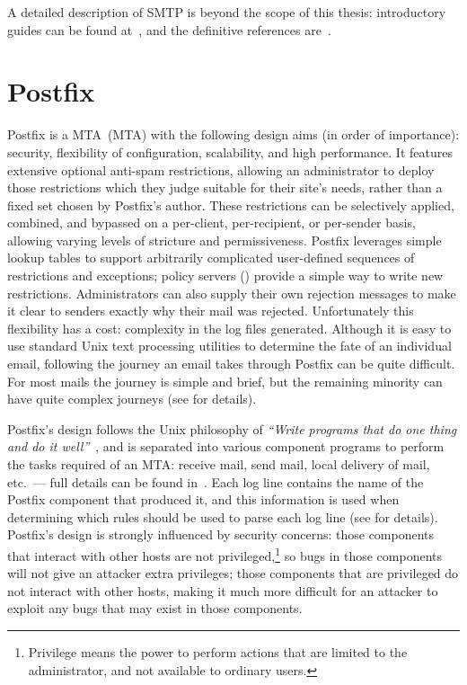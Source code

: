A detailed description of \gls{SMTP} is beyond the scope of this thesis:
introductory guides can be found at~\cite{smtp-intro-01,smtp-intro-02},
and the definitive references are~\cite{RFC821,RFC2821}.

\section{Postfix}

\label{postfix background}

Postfix is a \acrlong{MTA}~(\gls{MTA}) with the following design aims (in
order of importance): security, flexibility of configuration, scalability,
and high performance.  It features extensive optional anti-spam
restrictions, allowing an administrator to deploy those restrictions which
they judge suitable for their site's needs, rather than a fixed set chosen
by Postfix's author.  These restrictions can be selectively applied,
combined, and bypassed on a per-client, per-recipient, or per-sender basis,
allowing varying levels of stricture and permissiveness.  Postfix leverages
simple lookup tables to support arbitrarily complicated user-defined
sequences of restrictions and exceptions; policy servers
() provide a simple way to write new
restrictions.  Administrators can also supply their own rejection messages
to make it clear to senders exactly why their mail was rejected.
Unfortunately this flexibility has a cost: complexity in the log files
generated.  Although it is easy to use standard Unix text processing
utilities to determine the fate of an individual email, following the
journey an email takes through Postfix can be quite difficult.  For most
mails the journey is simple and brief, but the remaining minority can have
quite complex journeys (see  for details).

Postfix's design follows the Unix philosophy of \textit{``Write programs
that do one thing and do it well''\/}~\cite{unix-philosophy}, and is
separated into various component programs to perform the tasks required of
an \gls{MTA}\@: receive mail, send mail, local delivery of mail, etc.\ ---
full details can be found in~\cite{postfix-overview}.  Each log line
contains the name of the Postfix component that produced it, and this
information is used when determining which rules should be used to parse
each log line (see  for details).
Postfix's design is strongly influenced by security concerns: those
components that interact with other hosts are not
privileged,\footnote{Privilege means the power to perform actions that are
limited to the administrator, and not available to ordinary users.} so bugs
in those components will not give an attacker extra privileges; those
components that are privileged do not interact with other hosts, making it
much more difficult for an attacker to exploit any bugs that may exist in
those components.

